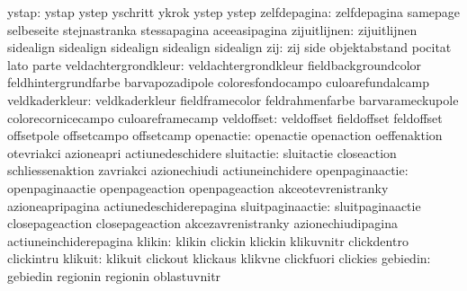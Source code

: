                     ystap: ystap                     ystep
                           yschritt                  ykrok
                           ystep                     ystep %
             zelfdepagina: zelfdepagina              samepage
                           selbeseite                stejnastranka
                           stessapagina              aceeasipagina
zijuitlijnen: zijuitlijnen sidealign
              sidealign    sidealign 
              sidealign    sidealign 
                      zij: zij                       side
                           objektabstand             pocitat
                           lato                      parte
     veldachtergrondkleur: veldachtergrondkleur      fieldbackgroundcolor
                           feldhintergrundfarbe      barvapozadipole
                           coloresfondocampo         culoarefundalcamp
           veldkaderkleur: veldkaderkleur            fieldframecolor
                           feldrahmenfarbe           barvarameckupole
                           colorecornicecampo        culoareframecamp
               veldoffset: veldoffset                fieldoffset
                           feldoffset                offsetpole
                           offsetcampo               offsetcamp
                openactie: openactie                 openaction
                           oeffenaktion              otevriakci
                           azioneapri                actiunedeschidere
               sluitactie: sluitactie                closeaction
                           schliessenaktion          zavriakci
                           azionechiudi              actiuneinchidere
          openpaginaactie: openpaginaactie           openpageaction
                           openpageaction            akceotevrenistranky
                           azioneapripagina          actiunedeschiderepagina %
         sluitpaginaactie: sluitpaginaactie          closepageaction
                           closepageaction           akcezavrenistranky
                           azionechiudipagina        actiuneinchiderepagina %
                   klikin: klikin                    clickin
                           klickin                   klikuvnitr
                           clickdentro               clickintru
                  klikuit: klikuit                   clickout
                           klickaus                  klikvne
                           clickfuori                clickies
                 gebiedin: gebiedin                  regionin
                           regionin                  oblastuvnitr

